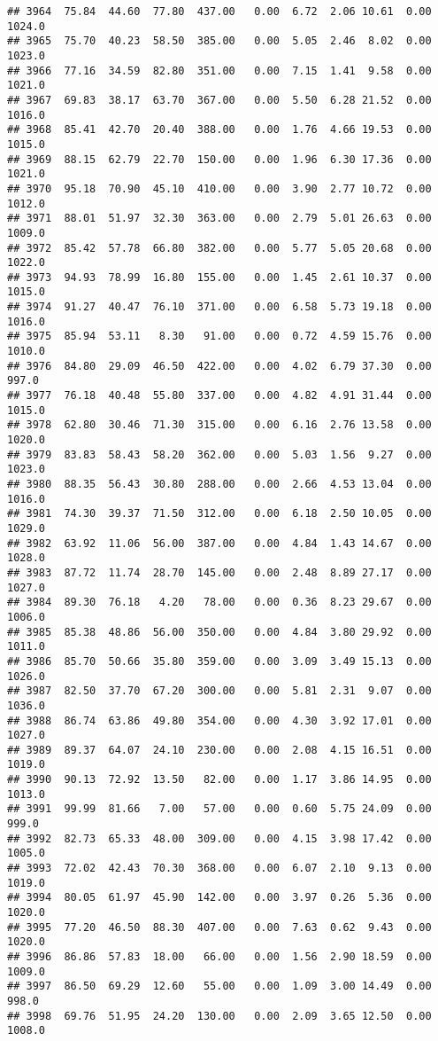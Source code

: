 \documentclass{article}\usepackage{graphicx, color}
\makeatletter
\newenvironment{kframe}{%
 \def\at@end@of@kframe{}%
 \ifinner\ifhmode%
  \def\at@end@of@kframe{\end{minipage}}%
  \begin{minipage}{\columnwidth}%
 \fi\fi%
 \def\FrameCommand##1{\hskip\@totalleftmargin \hskip-\fboxsep
 \colorbox{shadecolor}{##1}\hskip-\fboxsep
     \hskip-\linewidth \hskip-\@totalleftmargin \hskip\columnwidth}%
 \MakeFramed {\advance\hsize-\width
   \@totalleftmargin\z@ \linewidth\hsize
   \@setminipage}}%
 {\par\unskip\endMakeFramed%
 \at@end@of@kframe}
\newenvironment{knitrout}{}{} %
\makeatother
\begin{document}
\begin{knitrout}
\begin{kframe}
\begin{verbatim}
## 3964  75.84  44.60  77.80  437.00   0.00  6.72  2.06 10.61  0.00 1024.0
## 3965  75.70  40.23  58.50  385.00   0.00  5.05  2.46  8.02  0.00 1023.0
## 3966  77.16  34.59  82.80  351.00   0.00  7.15  1.41  9.58  0.00 1021.0
## 3967  69.83  38.17  63.70  367.00   0.00  5.50  6.28 21.52  0.00 1016.0
## 3968  85.41  42.70  20.40  388.00   0.00  1.76  4.66 19.53  0.00 1015.0
## 3969  88.15  62.79  22.70  150.00   0.00  1.96  6.30 17.36  0.00 1021.0
## 3970  95.18  70.90  45.10  410.00   0.00  3.90  2.77 10.72  0.00 1012.0
## 3971  88.01  51.97  32.30  363.00   0.00  2.79  5.01 26.63  0.00 1009.0
## 3972  85.42  57.78  66.80  382.00   0.00  5.77  5.05 20.68  0.00 1022.0
## 3973  94.93  78.99  16.80  155.00   0.00  1.45  2.61 10.37  0.00 1015.0
## 3974  91.27  40.47  76.10  371.00   0.00  6.58  5.73 19.18  0.00 1016.0
## 3975  85.94  53.11   8.30   91.00   0.00  0.72  4.59 15.76  0.00 1010.0
## 3976  84.80  29.09  46.50  422.00   0.00  4.02  6.79 37.30  0.00  997.0
## 3977  76.18  40.48  55.80  337.00   0.00  4.82  4.91 31.44  0.00 1015.0
## 3978  62.80  30.46  71.30  315.00   0.00  6.16  2.76 13.58  0.00 1020.0
## 3979  83.83  58.43  58.20  362.00   0.00  5.03  1.56  9.27  0.00 1023.0
## 3980  88.35  56.43  30.80  288.00   0.00  2.66  4.53 13.04  0.00 1016.0
## 3981  74.30  39.37  71.50  312.00   0.00  6.18  2.50 10.05  0.00 1029.0
## 3982  63.92  11.06  56.00  387.00   0.00  4.84  1.43 14.67  0.00 1028.0
## 3983  87.72  11.74  28.70  145.00   0.00  2.48  8.89 27.17  0.00 1027.0
## 3984  89.30  76.18   4.20   78.00   0.00  0.36  8.23 29.67  0.00 1006.0
## 3985  85.38  48.86  56.00  350.00   0.00  4.84  3.80 29.92  0.00 1011.0
## 3986  85.70  50.66  35.80  359.00   0.00  3.09  3.49 15.13  0.00 1026.0
## 3987  82.50  37.70  67.20  300.00   0.00  5.81  2.31  9.07  0.00 1036.0
## 3988  86.74  63.86  49.80  354.00   0.00  4.30  3.92 17.01  0.00 1027.0
## 3989  89.37  64.07  24.10  230.00   0.00  2.08  4.15 16.51  0.00 1019.0
## 3990  90.13  72.92  13.50   82.00   0.00  1.17  3.86 14.95  0.00 1013.0
## 3991  99.99  81.66   7.00   57.00   0.00  0.60  5.75 24.09  0.00  999.0
## 3992  82.73  65.33  48.00  309.00   0.00  4.15  3.98 17.42  0.00 1005.0
## 3993  72.02  42.43  70.30  368.00   0.00  6.07  2.10  9.13  0.00 1019.0
## 3994  80.05  61.97  45.90  142.00   0.00  3.97  0.26  5.36  0.00 1020.0
## 3995  77.20  46.50  88.30  407.00   0.00  7.63  0.62  9.43  0.00 1020.0
## 3996  86.86  57.83  18.00   66.00   0.00  1.56  2.90 18.59  0.00 1009.0
## 3997  86.50  69.29  12.60   55.00   0.00  1.09  3.00 14.49  0.00  998.0
## 3998  69.76  51.95  24.20  130.00   0.00  2.09  3.65 12.50  0.00 1008.0

\end{verbatim}
\end{kframe}
\end{knitrout}
\end{document}
